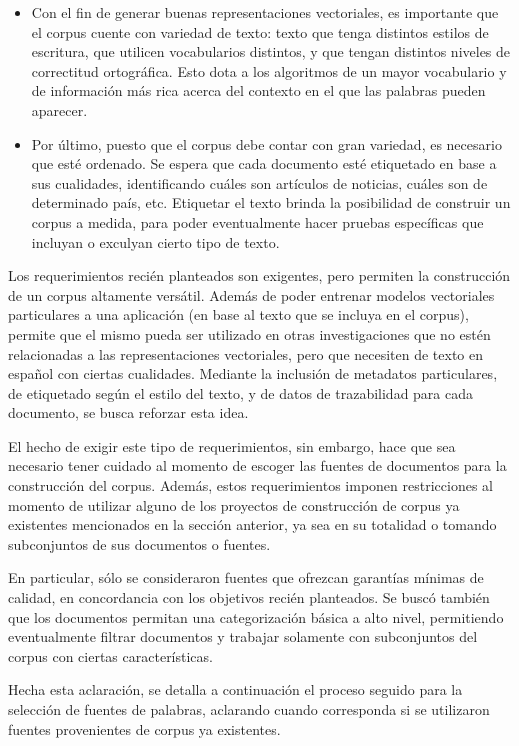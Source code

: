 \begin{itemize}
\item Con el fin de generar buenas representaciones vectoriales, es importante que el corpus cuente
con variedad de texto: texto que tenga distintos estilos de escritura, que utilicen vocabularios
distintos, y que tengan distintos niveles de correctitud ortográfica. Esto dota a los algoritmos de
un mayor vocabulario y de información más rica acerca del contexto en el que las palabras pueden
aparecer.

\item Por último, puesto que el corpus debe contar con gran variedad, es necesario que esté
ordenado. Se espera que cada documento esté etiquetado en base a sus cualidades, identificando
cuáles son artículos de noticias, cuáles son de determinado país, etc. Etiquetar el texto brinda la
posibilidad de construir un corpus a medida, para poder eventualmente hacer pruebas específicas que
incluyan o exculyan cierto tipo de texto.

\end{itemize}

Los requerimientos recién planteados son exigentes, pero permiten la construcción de un corpus
altamente versátil. Además de poder entrenar modelos vectoriales particulares a una aplicación (en
base al texto que se incluya en el corpus), permite que el mismo pueda ser utilizado en otras
investigaciones que no estén relacionadas a las representaciones vectoriales, pero que necesiten de
texto en español con ciertas cualidades. Mediante la inclusión de metadatos particulares, de
etiquetado según el estilo del texto, y de datos de trazabilidad para cada documento, se busca
reforzar esta idea.

El hecho de exigir este tipo de requerimientos, sin embargo, hace que sea necesario tener cuidado al
momento de escoger las fuentes de documentos para la construcción del corpus. Además, estos
requerimientos imponen restricciones al momento de utilizar alguno de los proyectos de construcción
de corpus ya existentes mencionados en la sección anterior, ya sea en su totalidad o tomando
subconjuntos de sus documentos o fuentes.

En particular, sólo se consideraron fuentes que ofrezcan garantías mínimas de calidad, en concordancia
con los objetivos recién planteados. Se buscó también que los documentos permitan una categorización
básica a alto nivel, permitiendo eventualmente filtrar documentos y trabajar solamente con subconjuntos
del corpus con ciertas características.

Hecha esta aclaración, se detalla a continuación el proceso seguido para la selección de fuentes de
palabras, aclarando cuando corresponda si se utilizaron fuentes provenientes de corpus ya existentes.


